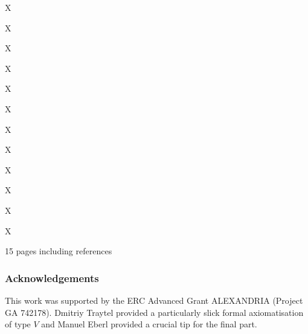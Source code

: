 \documentclass[runningheads]{llncs}
\begin{document}
\begin{isabelle}
X
\end{isabelle}

\begin{isabelle}
X
\end{isabelle}

\begin{isabelle}
X
\end{isabelle}

\begin{isabelle}
X
\end{isabelle}

\begin{isabelle}
X
\end{isabelle}

\begin{isabelle}
X
\end{isabelle}

\begin{isabelle}
X
\end{isabelle}

\begin{isabelle}
X
\end{isabelle}

\begin{isabelle}
X
\end{isabelle}

\begin{isabelle}
X
\end{isabelle}

\begin{isabelle}
X
\end{isabelle}

\begin{isabelle}
X
\end{isabelle}



15 pages including references


\subsubsection{Acknowledgements} 
This work was supported by the ERC Advanced Grant ALEXANDRIA (Project GA 742178). 
Dmitriy Traytel provided a particularly slick formal axiomatisation of type $V$ and Manuel Eberl provided a crucial tip for the final part.



\end{document}
